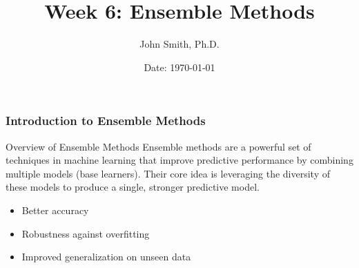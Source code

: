 \documentclass[aspectratio=169]{beamer}
\begin{document}
\frame{\titlepage}

\begin{frame}[fragile]
    \title{Week 6: Ensemble Methods}
    \author{John Smith, Ph.D.}
    \date{Date: \today}
    \maketitle
\end{frame}

\begin{frame}[fragile]
    \frametitle{Introduction to Ensemble Methods}
    
    \begin{block}{Overview of Ensemble Methods}
        Ensemble methods are a powerful set of techniques in machine learning that improve predictive performance by combining multiple models (base learners). Their core idea is leveraging the diversity of these models to produce a single, stronger predictive model.
    \end{block}
    
    \begin{itemize}
        \item Better accuracy
        \item Robustness against overfitting
        \item Improved generalization on unseen data
    \end{itemize}
\end{frame}
\end{document}
